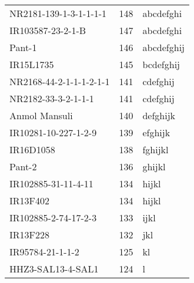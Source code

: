 \documentclass[]{article}
\begin{document}
\begin{longtable}{lll}
NR2181-139-1-3-1-1-1-1 & 148 & abcdefghi\\
\rowcolor{gray!6}  IR103587-23-2-1-B & 147 & abcdefghi\\
Pant-1 & 146 & abcdefghij\\
\addlinespace
\rowcolor{gray!6}  IR15L1735 & 145 & bcdefghij\\
NR2168-44-2-1-1-1-2-1-1 & 141 & cdefghij\\
\rowcolor{gray!6}  NR2182-33-3-2-1-1-1 & 141 & cdefghij\\
Anmol Mansuli & 140 & defghijk\\
\rowcolor{gray!6}  IR10281-10-227-1-2-9 & 139 & efghijk\\
\addlinespace
IR16D1058 & 138 & fghijkl\\
\rowcolor{gray!6}  Pant-2 & 136 & ghijkl\\
IR102885-31-11-4-11 & 134 & hijkl\\
\rowcolor{gray!6}  IR13F402 & 134 & hijkl\\
IR102885-2-74-17-2-3 & 133 & ijkl\\
\addlinespace
\rowcolor{gray!6}  IR13F228 & 132 & jkl\\
IR95784-21-1-1-2 & 125 & kl\\
\rowcolor{gray!6}  HHZ3-SAL13-4-SAL1 & 124 & l\\
\bottomrule
\end{longtable}
\endgroup{}
\begingroup\fontsize{12}{14}\selectfont
\end{document}
